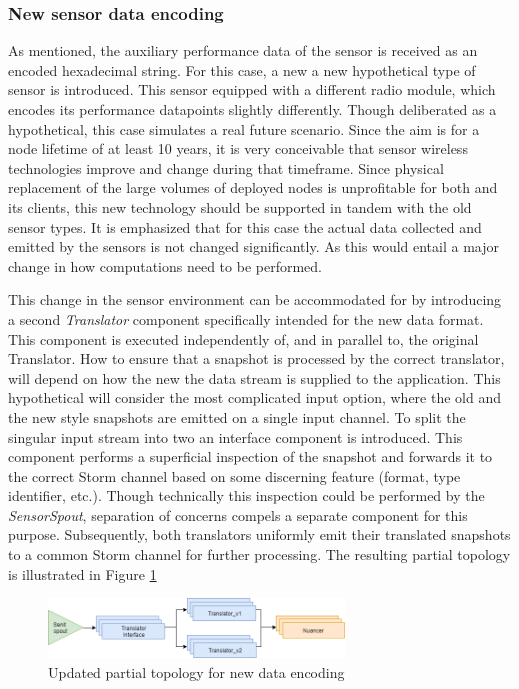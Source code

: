 \subsubsection{New sensor data encoding}
As mentioned, the auxiliary performance data of the sensor is received as an encoded hexadecimal string. For this case, a new a new hypothetical type of sensor is introduced. This sensor equipped with a different radio module, which encodes its performance datapoints slightly differently. Though deliberated as a hypothetical, this case simulates a real future scenario. Since the aim is for a node lifetime of at least 10 years, it is very conceivable that sensor wireless technologies improve and change during that timeframe. Since physical replacement of the large volumes of deployed nodes is unprofitable for both \nedap and its clients, this new technology should be supported in tandem with the old sensor types. It is emphasized that for this case the actual data collected and emitted by the sensors is not changed significantly. As this would entail a major change in how computations need to be performed.

This change in the sensor environment can be accommodated for by introducing a second \emph{Translator} component specifically intended for the new data format. This component is executed independently of, and in parallel to, the original Translator. How to ensure that a snapshot is processed by the correct translator, will depend on how the new the data stream is supplied to the application. This hypothetical will consider the most complicated input option, where the old and the new style snapshots are emitted on a single input channel. To split the singular input stream into two an interface component is introduced. This component performs a superficial inspection of the snapshot and forwards it to the correct Storm channel based on some discerning feature (format, type identifier, etc.). Though technically this inspection could be performed by the \emph{SensorSpout}, separation of concerns compels a separate component for this purpose. Subsequently, both translators uniformly emit their translated snapshots to a common Storm channel for further processing. The resulting partial topology is illustrated in Figure \ref{fig:update_encoding}

\begin{figure}
\centering
\includegraphics[width=0.7\textwidth]{resources/img/update_encoding.png}
\caption{Updated partial topology for new data encoding}
\label{fig:update_encoding}
\end{figure}


